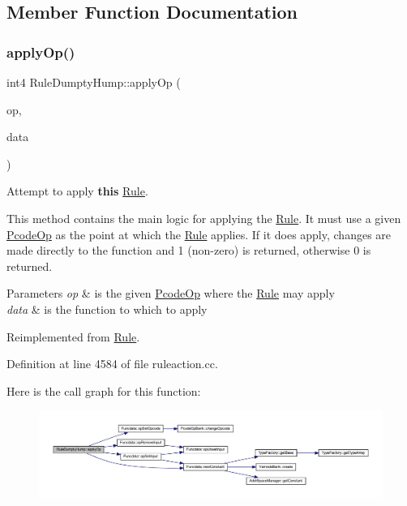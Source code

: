 \subsection{Member Function Documentation}
\mbox{\label{class_rule_dumpty_hump_a700703eddec46851943420aa51eefcb5}} 
\subsubsection{\texorpdfstring{applyOp()}{applyOp()}}
{\footnotesize\ttfamily int4 Rule\+Dumpty\+Hump\+::apply\+Op (\begin{DoxyParamCaption}\item[{\mbox{\hyperlink{class_pcode_op}{Pcode\+Op}} $\ast$}]{op,  }\item[{\mbox{\hyperlink{class_funcdata}{Funcdata}} \&}]{data }\end{DoxyParamCaption})\hspace{0.3cm}{\ttfamily [virtual]}}



Attempt to apply {\bfseries{this}} \mbox{\hyperlink{class_rule}{Rule}}. 

This method contains the main logic for applying the \mbox{\hyperlink{class_rule}{Rule}}. It must use a given \mbox{\hyperlink{class_pcode_op}{Pcode\+Op}} as the point at which the \mbox{\hyperlink{class_rule}{Rule}} applies. If it does apply, changes are made directly to the function and 1 (non-\/zero) is returned, otherwise 0 is returned. 
\begin{DoxyParams}{Parameters}
{\em op} & is the given \mbox{\hyperlink{class_pcode_op}{Pcode\+Op}} where the \mbox{\hyperlink{class_rule}{Rule}} may apply \\
\hline
{\em data} & is the function to which to apply \\
\hline
\end{DoxyParams}


Reimplemented from \mbox{\hyperlink{class_rule_a4e3e61f066670175009f60fb9dc60848}{Rule}}.



Definition at line 4584 of file ruleaction.\+cc.

Here is the call graph for this function\+:
\nopagebreak
\begin{figure}[H]
\begin{center}
\leavevmode
\includegraphics[width=350pt]{class_rule_dumpty_hump_a700703eddec46851943420aa51eefcb5_cgraph}
\end{center}
\end{figure}
\mbox{\label{class_rule_dumpty_hump_af67f659ce222cccd5531261445c70db7}} 

